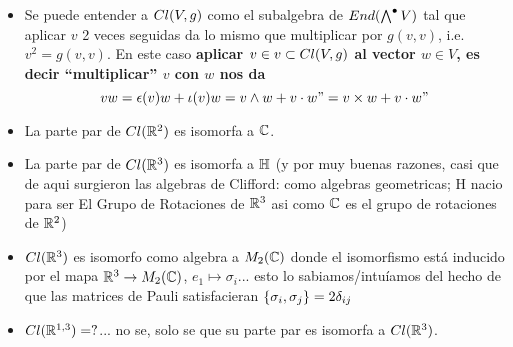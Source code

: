 \begin{frame}
\begin{itemize}
        \item Se puede entender a $Cl(V, g)$ como el subalgebra de $End(\bigwedge^\bullet V)$ tal que aplicar $v$ 2 veces seguidas da lo mismo que multiplicar por $g(v, v)$, i.e. $v^2 = g(v, v)$. En este caso \textbf{aplicar $v \in v \subset Cl(V, g)$ al vector $w \in V$, es decir ``multiplicar'' $v$ con $w$ nos da \[vw = \epsilon(v)w + \iota(v)w = v \wedge w + v \cdot w "= v \times w + v \cdot w "\]}
        
        \item La parte par de $Cl(\mathbb R^2)$ es isomorfa a $\mathbb C$.
        
        \item La parte par de $Cl(\mathbb R^3)$ es isomorfa a $\mathbb H$ (y por muy buenas razones, casi que de aqui surgieron las algebras de Clifford: como algebras geometricas; H nacio para ser El Grupo de Rotaciones de $\mathbb R^3$ asi como $\mathbb C$ es el grupo de rotaciones de $\mathbb R^2$)
        
        \item $Cl(\mathbb R^3)$ es isomorfo como algebra a $M_2(\mathbb C)$ donde el isomorfismo está inducido por el mapa $\mathbb R^3 \to M_2(\mathbb C)$, $e_1 \mapsto \sigma_i$... esto lo sabiamos/intuíamos del hecho de que las matrices de Pauli satisfacieran $\{\sigma_i, \sigma_j\} = 2 \delta_{ij}$
        
        \item $Cl(\mathbb R^{1, 3}) = ?$... no se, solo se que su parte par es isomorfa a $Cl(\mathbb R^3)$.
            
        \end{itemize}
\end{frame}
